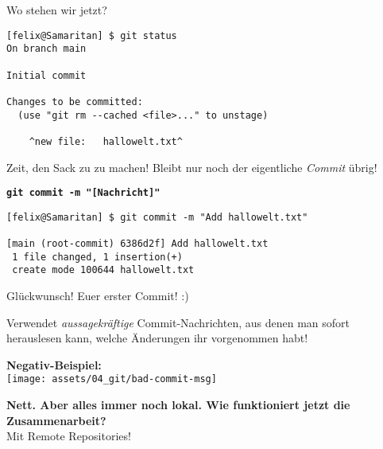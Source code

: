 \begin{frame}[fragile]{Wo stehen wir jetzt?}
	\begin{lstlisting}
[felix@Samaritan] $ git status
On branch main

Initial commit

Changes to be committed:
  (use "git rm --cached <file>..." to unstage)

    ^new file:   hallowelt.txt^
\end{lstlisting}
\end{frame}

\begin{frame}[fragile]{Zeit, den Sack zu zu machen!}
	\centering Bleibt nur noch der eigentliche \emph{Commit} übrig!

	\Large \textbf{\texttt{\alert{git commit -m "[Nachricht]"}}}\\[.7cm]

	\begin{lstlisting}
[felix@Samaritan] $ git commit -m "Add hallowelt.txt"

[main (root-commit) 6386d2f] Add hallowelt.txt
 1 file changed, 1 insertion(+)
 create mode 100644 hallowelt.txt
\end{lstlisting}
	\normalsize
	
	\begin{center} Glückwunsch! Euer erster Commit! :) \end{center}
\end{frame}

\begin{frame}
	\begin{description}[Tipp:]
		\item [\alert{Tipp:}] Verwendet \emph{aussagekräftige} Commit-Nachrichten, aus denen man sofort herauslesen kann, welche Änderungen ihr vorgenommen habt!
	\end{description}
	\vfill
	\textbf{Negativ-Beispiel:}\\[.2cm]
	\centering \texttt{[image: assets/04\_git/bad-commit-msg]}
\end{frame}

\begin{frame}
	\centering\Large\textbf{Nett. Aber alles immer noch lokal. Wie funktioniert jetzt die Zusammenarbeit?}\\[.7cm]
	\pause
	\alert{Mit Remote Repositories!}
\end{frame}


